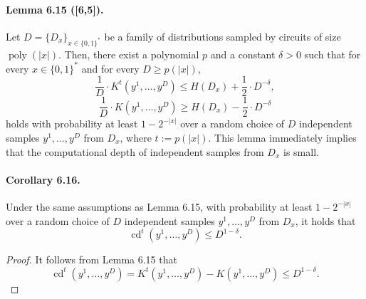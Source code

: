 \paragraph{Lemma 6.15 ([6,5]).}
Let $D=\{D_x\}_{x\in\{0,1\}^*}$ be a family of distributions sampled by circuits of size $\operatorname{poly}(|x|)$. Then, there exist a polynomial $p$ and a constant $\delta>0$ such that for every $x\in\{0,1\}^*$ and for every $D\geq p(|x|)$,
\[\frac1D\cdot K^t(y^1,\ldots,y^D)\leq H(D_x)+\frac12\cdot D^{-\delta},\]
\[\frac1D\cdot K(y^1,\ldots,y^D)\geq H(D_x)-\frac12\cdot D^{-\delta}\]
holds with probability at least $1-2^{-|x|}$ over a random choice of $D$ independent samples $y^1,\ldots,y^D$ from $D_x$, where $t:=p(|x|)$.
This lemma immediately implies that the computational depth of independent samples from $D_x$ is small.
\paragraph{Corollary 6.16.}
Under the same assumptions as Lemma 6.15, with probability at least $1-2^{-|x|}$ over a random choice of $D$ independent samples $y^1,\ldots,y^D$ from $D_x$, it holds that
\[\operatorname{cd}^t(y^1,\ldots,y^D)\leq D^{1-\delta}.\]
\begin{proof}
It follows from Lemma 6.15 that
\[\operatorname{cd}^t(y^1,\ldots,y^D)=K^t(y^1,\ldots,y^D)-K(y^1,\ldots,y^D)\leq D^{1-\delta}.\]
\end{proof}
